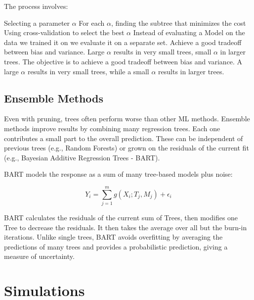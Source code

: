 \documentclass[12pt]{article}
\begin{document}
The process involves:

Selecting a parameter $\alpha$
For each $\alpha$, finding the subtree that minimizes the cost
Using cross-validation to select the best $\alpha$
Instead of evaluating a Model on the data we trained it on we evaluate it on a separate set.
Achieve a good tradeoff between bias and variance.
Large \( \alpha \) results in very small trees, small \( \alpha \) in larger trees.
The objective is to achieve a good tradeoff between bias and variance. A large $\alpha$ results in very small trees, while a small $\alpha$ results in larger trees.


\subsection{Ensemble Methods}
Even with pruning, trees often perform worse than other ML methods. Ensemble methods improve results by combining many regression trees. Each one contributes a small part to the overall prediction. These can be independent of previous trees (e.g., Random Forests) or grown on the residuals of the current fit (e.g., Bayesian Additive Regression Trees - BART).

BART models the response as a sum of many tree-based models plus noise:

\begin{equation}
    Y_i = \sum_{j=1}^{m} g(X_i; T_j, M_j) + \epsilon_i
\end{equation}

BART calculates the residuals of the current sum of Trees, then modifies one Tree to decrease the residuals. It then takes the average over all but the burn-in iterations. Unlike single trees, BART avoids overfitting by averaging the predictions of many trees and provides a probabilistic prediction, giving a measure of uncertainty.








\section{Simulations}
\end{document}
